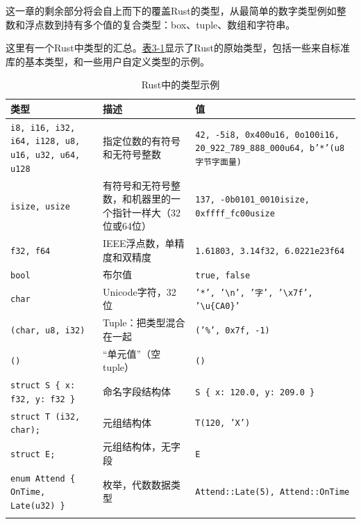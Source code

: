这一章的剩余部分将会自上而下的覆盖Rust的类型，从最简单的数字类型例如整数和浮点数到持有多个值的复合类型：box、tuple、数组和字符串。

这里有一个Rust中类型的汇总。\hyperref[t3-1]{表3-1}显示了Rust的原始类型，包括一些来自标准库的基本类型，和一些用户自定义类型的示例。

\begin{longtable}{p{}p{}p{}}
    \caption{Rust中的类型示例}
    \label{t3-1}\\
    \hline
    \textbf{类型}   & \textbf{描述}    & \textbf{值}    \\
    \hline
    \texttt{i8, i16, i32, i64, i128, u8, u16, u32, u64, u128}    & 指定位数的有符号和无符号整数 & \texttt{42, -5i8, 0x400u16, 0o100i16, 20\_922\_789\_888\_000u64, b'*'(u8字节字面量)}    \\
    \rowcolor{tablecolor}
    \texttt{isize, usize}   & 有符号和无符号整数，和机器里的一个指针一样大（32位或64位）   & \texttt{137, -0b0101\_0010isize, 0xffff\_fc00usize} \\
    \texttt{f32, f64}       & IEEE浮点数，单精度和双精度                                & \texttt{1.61803, 3.14f32, 6.0221e23f64} \\
    \rowcolor{tablecolor}
    \texttt{bool}           & 布尔值            & \texttt{true, false} \\
    \texttt{char}           & Unicode字符，32位 & \texttt{'*', '\textbackslash n', '字', '\textbackslash x7f', '\textbackslash u\{CA0\}'} \\
    \rowcolor{tablecolor}
    \texttt{(char, u8, i32)}                        & Tuple：把类型混合在一起   & \texttt{('\%', 0x7f, -1)} \\
    \texttt{()}                                     & “单元值”（空tuple）      & \texttt{()} \\
    \rowcolor{tablecolor}
    \texttt{struct S \{ x: f32, y: f32 \}}          & 命名字段结构体            & \texttt{S \{ x: 120.0, y: 209.0 \}} \\
    \texttt{struct T (i32, char);}                  & 元组结构体                & \texttt{T(120, 'X')} \\
    \rowcolor{tablecolor}
    \texttt{struct E;}                              & 元组结构体，无字段        & \texttt{E} \\
    \texttt{enum Attend \{ OnTime, Late(u32) \}}    & 枚举，代数数据类型        & \texttt{Attend::Late(5), Attend::OnTime} \\
    \rowcolor{tablecolor}

\end{longtable}
